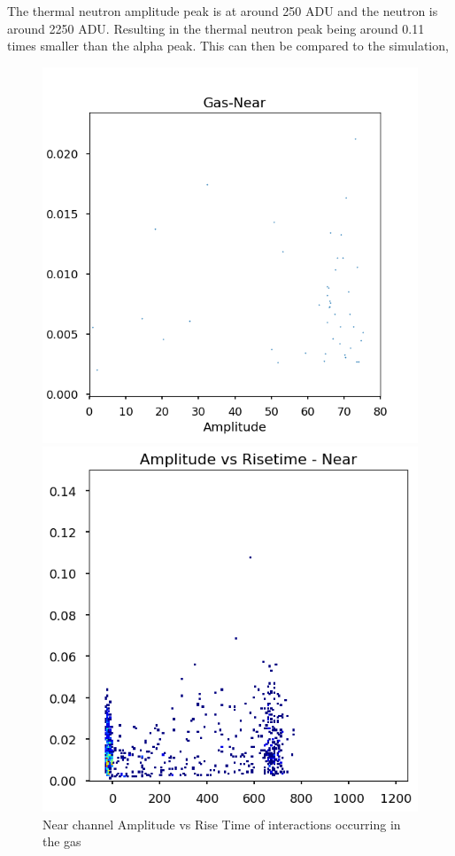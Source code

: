 \documentclass[a4paper]{article}
\begin{document}
\noindent The thermal neutron amplitude peak is at around 250 ADU and the neutron is around 2250 ADU. Resulting in the thermal neutron peak being around 0.11 times smaller than the alpha peak. This can then be compared to the simulation, 
\begin{figure}[H]
    \centering
    \begin{minipage}{.5\textwidth}
        \centering
        \includegraphics[width=1\linewidth]{Radon/steel_achinos_gas_south.png}
        \caption{Near channel Amplitude vs Rise Time of interactions occurring in the gas}
        \label{fig:prob1_6_2}
    \end{minipage}%
    \begin{minipage}{0.5\textwidth}
        \centering
        \includegraphics[width=1\linewidth]{Radon/steel_achinos-2d_South_alpha3.png}

\end{minipage}
\end{figure}
\end{document}
